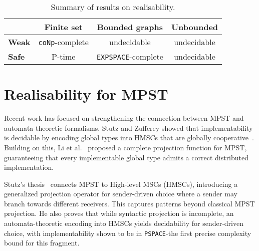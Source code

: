 \begin{table}[!ht]
	\centering
	\begin{tabular}{|l|c|c|c|}
		\hline
		& \textbf{Finite set} & \textbf{Bounded graphs} & \textbf{Unbounded} \\
		\hline
		\textbf{Weak} & \verb|coNp|-complete & undecidable & undecidable \\
		\hline
		\textbf{Safe} & P-time & \verb|EXPSPACE|-complete & undecidable \\
		\hline
	\end{tabular}
	\caption{Summary of results on realisability.}
	\label{tab:realisability}
\end{table}

\section{Realisability for MPST}

Recent work has focused on strengthening the connection between MPST 
and automata-theoretic formalisms. Stutz and Zufferey 
showed that implementability is decidable by encoding global types 
into HMSCs that are globally cooperative~\cite{stutz2022comparing,stutz2023asynchronous}. 
Building on this, Li et al.~\cite{li2023complete} proposed a complete 
projection function for MPST, guaranteeing that every implementable 
global type admits a correct distributed implementation.

Stutz’s thesis~\cite{stutz2024implementability} connects MPST to 
High-level MSCs (HMSCs), introducing a generalized projection operator 
for sender-driven choice where a sender may branch towards different 
receivers. This captures patterns beyond classical MPST projection.  
He also proves that while syntactic projection is incomplete, 
an automata-theoretic encoding into HMSCs yields decidability for 
sender-driven choice, with implementability shown to be in 
\verb|PSPACE|-the first precise complexity bound for this fragment.

